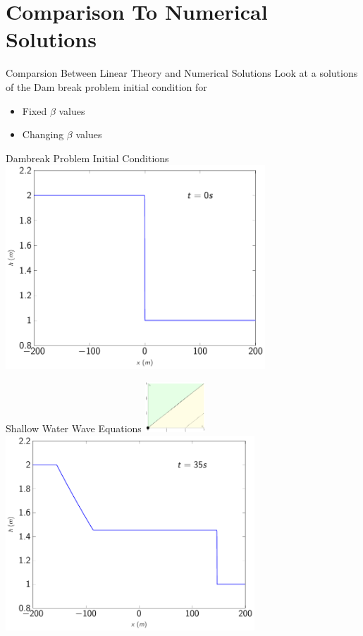 \documentclass[pdf]{beamer}
\begin{document}
\section{Comparison To Numerical Solutions}
\begin{frame}{Comparsion Between Linear Theory and Numerical Solutions}
Look at a solutions of the Dam break problem initial condition for
\begin{itemize}
	\item Fixed $\beta$ values
	\item Changing $\beta$ values
\end{itemize}
\end{frame}

\begin{frame}{Dambreak Problem Initial Conditions}
\centering
\includegraphics[width=0.73\textwidth]{./Pics/Tex/Results/DB/Init/Init.pdf}
\end{frame}

\begin{frame}{Shallow Water Wave Equations \hfill \includegraphics[width=0.17\textwidth]{./Pics/Tex/Explanatory/RegionsPlot/SPSWWE.pdf}}
\centering
\includegraphics[width=0.7\textwidth]{./Pics/Tex/Results/DB/SWWE/SWWE.pdf}
\end{frame}
\end{document}
